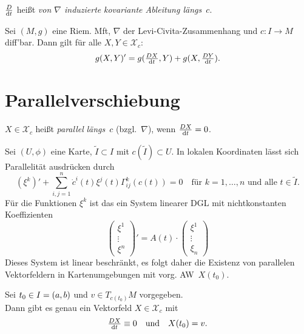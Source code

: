 \documentclass{cheat-sheet}
\newcommand{\coord}[1]{\tfrac{\partial^\phi}{\partial x^{#1}}} %
\newcommand{\VF}{\mathcal{X}} %
\begin{document}
\begin{defn}
  $\tfrac{D}{\mathrm{d} t}$ heißt \textit{von $\nabla$ induzierte} \emph{kovariante Ableitung längs~$c$}.
\end{defn}


\begin{satz}
  Sei $(M, g)$ eine Riem. Mft, $\nabla$ der Levi-Civita-Zusammenhang und $c : I \to M$ diff'bar. Dann gilt für alle $X, Y \in \VF_c$:
  \[
    g(X, Y)' = g(\tfrac{D X}{\mathrm{d} t}, Y) + g(X, \tfrac{D Y}{\mathrm{d} t}).
  \]
\end{satz}

\section{Parallelverschiebung}

\begin{defn}
  $X \in \VF_c$ heißt \emph{parallel} \textit{längs}~$c$ (bzgl.~$\nabla$), wenn $\tfrac{D X}{\mathrm{d} t} = 0$.
\end{defn}

\begin{bem}
  Sei $(U, \phi)$ eine Karte, $\tilde{I} \subset I$ mit $c(\tilde{I}) \subset U$.
  In lokalen Koordinaten lässt sich Parallelität ausdrücken durch
  \[
    (\xi^{k})' + \sum_{i,j=1}^n \dot{c}^i(t) \xi^j (t) \Gamma_{ij}^k(c(t)) = 0
    \quad \text{für $k = 1, \ldots, n$ und alle $t \in \tilde{I}$.}
  \]
  Für die Funktionen $\xi^k$ ist das ein System linearer DGL mit nichtkonstanten Koeffizienten
  \[
    \begin{pmatrix}
      \xi^1 \\
      \vdots \\
      \xi^n
    \end{pmatrix}' = A(t) \cdot
    \begin{pmatrix}
      \xi^1 \\
      \vdots \\
      \xi_n
    \end{pmatrix}
  \]
  Dieses System ist linear beschränkt, es folgt daher die Existenz von parallelen Vektorfeldern in Kartenumgebungen mit vorg. AW~$X(t_0)$.
\end{bem}

\begin{satz}
  Sei $t_0 \in I = \left( a, b \right)$ und $v \in T_{c(t_0)} M$ vorgegeben. \\
  Dann gibt es genau ein Vektorfeld $X \in \VF_c$ mit
  \[
    \tfrac{D X}{\mathrm{d} t} \equiv 0
    \quad \text{und} \quad
    X(t_0) = v.
  \]
\end{satz}
\end{document}
